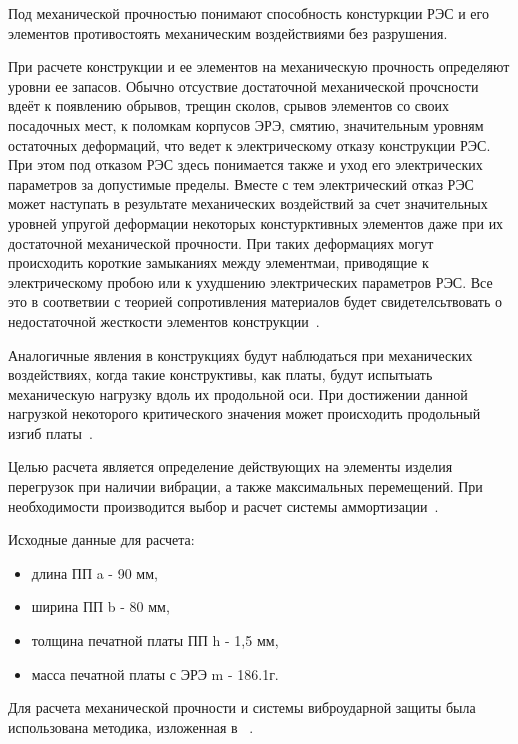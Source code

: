 Под механической прочностью понимают способность констуркции РЭС и его
элементов противостоять механическим воздействиями без разрушения.

При расчете конструкции и ее элементов на механическую прочность
определяют уровни ее запасов.  Обычно отсуствие достаточной
механической прочсности вдеёт к появлению обрывов, трещин сколов,
срывов элементов со своих посадочных мест, к поломкам корпусов ЭРЭ,
смятию, значительным уровням остаточных деформаций, что ведет к
электрическому отказу конструкции РЭС.
При этом под отказом РЭС здесь понимается также и уход его
электрических параметров за допустимые пределы. Вместе с тем
электрический отказ РЭС может наступать в результате механических
воздействий за счет значительных уровней упругой деформации некоторых
констурктивных элементов даже при их достаточной механической
прочности. При таких деформациях могут происходить короткие замыканиях
между элементмаи, приводящие к электрическому пробою или к ухудшению
электрических параметров РЭС. Все это в соответвии с теорией
сопротивления материалов будет свидетелсьтвовать о недостаточной
жесткости элементов конструкции~\cite{Kalenkovich1989}.

Аналогичные явления в конструкциях будут наблюдаться при механических
воздействиях, когда такие конструктивы, как платы, будут испытыать
механическую нагрузку вдоль их продольной оси.
При достижении данной нагрузкой некоторого критического значения может
происходить продольный изгиб платы~\cite{Kalenkovich1989}.

Целью расчета является определение действующих на элементы изделия
перегрузок при наличии вибрации, а также максимальных перемещений.
При необходимости производится выбор и расчет системы
аммортизации~\cite{Kalenkovich2012}.

Исходные данные для расчета:
\begin{itemize}
\item длина ПП a - 90 мм,
  
\item ширина ПП b - 80 мм,
  
\item толщина печатной платы ПП h - 1,5 мм,
  
\item масса печатной платы с ЭРЭ m - 186.1г.
\end{itemize}

Для расчета механической прочности и системы виброударной защиты была
использована методика, изложенная в ~\cite{Kostukevich2011}.

